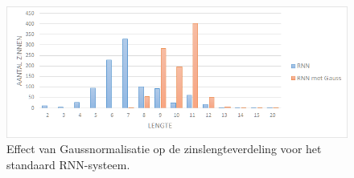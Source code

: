 \begin{figure}[tb]
	\centering
	\includegraphics[width=\textwidth]{Images/gauss_length.PNG}
	\caption[Effect van Gaussnormalisatie op de zinslengteverdeling]{Effect van Gaussnormalisatie op de zinslengteverdeling voor het standaard RNN-systeem.}
	\label{fig:gauss}
\end{figure}  
